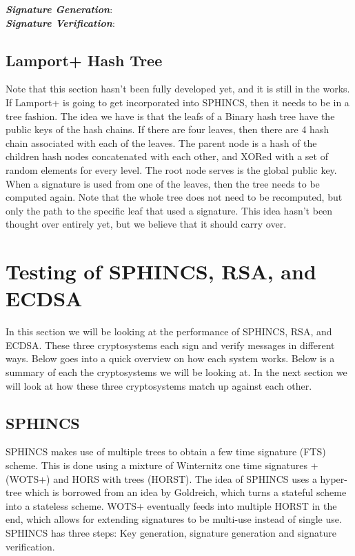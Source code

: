\documentclass[]{scrartcl}
\begin{document}
\textbf{\textit{Signature Generation}}: \\
\textbf{\textit{Signature Verification}}: 


\subsection*{Lamport+ Hash Tree}
Note that this section hasn't been fully developed yet, and it is still in the works. If Lamport+ is going to get incorporated into SPHINCS, then it needs to be in a tree fashion. The idea we have is that the leafs of a Binary hash tree have the public keys of the hash chains. If there are four leaves, then there are 4 hash chain associated with each of the leaves. The parent node is a hash of the children hash nodes concatenated with each other, and XORed with a set of random elements for every level. The root node serves is the global public key.\\
When a signature is used from one of the leaves, then the tree needs to be computed again. Note that the whole tree does not need to be recomputed, but only the path to the specific leaf that used a signature. This idea hasn't been thought over entirely yet, but we believe that it should carry over.

\section*{Testing of SPHINCS, RSA, and ECDSA}
In this section we will be looking at the performance of SPHINCS, RSA, and ECDSA. These three cryptosystems each sign and verify messages in different ways. Below goes into a quick overview on how each system works. Below is a summary of each the cryptosystems we will be looking at. In the next section we will look at how these three cryptosystems match up against each other.

\subsection*{SPHINCS}
SPHINCS makes use of multiple trees to obtain a few time signature (FTS) scheme. This is done using a mixture of Winternitz one time signatures + (WOTS+) and HORS with trees (HORST). The idea of SPHINCS uses a hyper-tree which is borrowed from an idea by Goldreich, which turns a stateful scheme into a stateless scheme. WOTS+ eventually feeds into multiple HORST in the end, which allows for extending signatures to be multi-use instead of single use. SPHINCS has three steps: Key generation, signature generation and signature verification.
\end{document}
